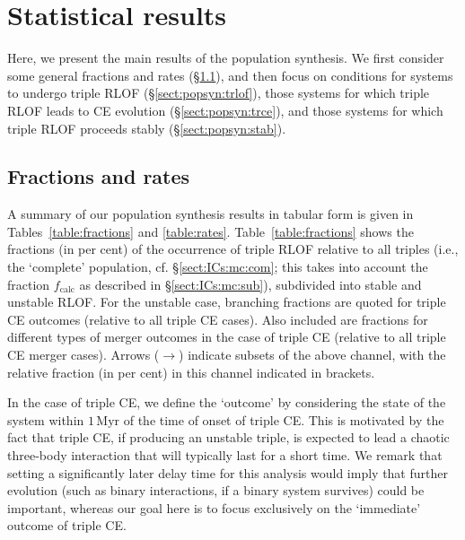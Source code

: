 \documentclass[twocolumn,appendixfloats,tighten]{aastex631}
\newcommand{\myr}{\mathrm{Myr}}
\begin{document}
\section{Statistical results}
\label{sect:popsyn}
Here, we present the main results of the population synthesis. We first consider some general fractions and rates (\S\ref{sect:popsyn:frac}), and then focus on conditions for systems to undergo triple RLOF (\S\ref{sect:popsyn:trlof}), those systems for which triple RLOF leads to CE evolution (\S\ref{sect:popsyn:trce}), and those systems for which triple RLOF proceeds stably (\S\ref{sect:popsyn:stab}). 

\subsection{Fractions and rates}
\label{sect:popsyn:frac}

A summary of our population synthesis results in tabular form is given in Tables~\ref{table:fractions} and \ref{table:rates}. Table~\ref{table:fractions} shows the fractions (in per cent) of the occurrence of triple RLOF relative to all triples (i.e., the `complete' population, cf. \S\ref{sect:ICs:mc:com}; this takes into account the fraction $f_\mathrm{calc}$ as described in \S\ref{sect:ICs:mc:sub}), subdivided into stable and unstable RLOF. For the unstable case, branching fractions are quoted for triple CE outcomes (relative to all triple CE cases). Also included are fractions for different types of merger outcomes in the case of triple CE (relative to all triple CE merger cases). Arrows ($\rightarrow$) indicate subsets of the above channel, with the relative fraction (in per cent) in this channel indicated in brackets. 

In the case of triple CE, we define the `outcome' by considering the state of the system within $1\,\myr$ of the time of onset of triple CE. This is motivated by the fact that triple CE, if producing an unstable triple, is expected to lead a chaotic three-body interaction that will typically last for a short time. We remark that setting a significantly later delay time for this analysis would imply that further evolution (such as binary interactions, if a binary system survives) could be important, whereas our goal here is to focus exclusively on the `immediate' outcome of triple CE. 
\end{document}
